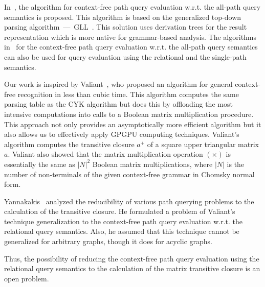 In~\cite{GLL}, the algorithm for context-free path query evaluation w.r.t. the all-path query semantics is proposed. This algorithm is based on the generalized top-down parsing algorithm~---~GLL~\cite{scott2010gll}. This solution uses derivation trees for the result representation which is more native for grammar-based analysis. The algorithms in~\cite{GLL, hellingsPathQuerying} for the context-free path query evaluation w.r.t. the all-path query semantics can also be used for query evaluation using the relational and the single-path semantics.

Our work is inspired by Valiant~\cite{valiant}, who proposed an algorithm for general context-free recognition in less than cubic time. This algorithm computes the same parsing table as the CYK algorithm but does this by offloading the most intensive computations into calls to a Boolean matrix multiplication procedure. This approach not only provides an asymptotically more efficient algorithm but it also allows us to effectively apply GPGPU computing techniques. Valiant's algorithm computes the transitive closure $a^+$ of a square upper triangular matrix $a$. Valiant also showed that the matrix multiplication operation $(\times)$ is essentially the same as $|N|^2$ Boolean matrix multiplications, where $|N|$ is the number of non-terminals of the given context-free grammar in Chomsky normal form.

Yannakakis~\cite{transitive-closure} analyzed the reducibility of various path querying problems to the calculation of the transitive closure. He formulated a problem of Valiant's technique generalization to the context-free path query evaluation w.r.t. the relational query semantics. Also, he assumed that this technique cannot be generalized for arbitrary graphs, though it does for acyclic graphs.

Thus, the possibility of reducing the context-free path query evaluation using the relational query semantics to the calculation of the matrix transitive closure is an open problem.
